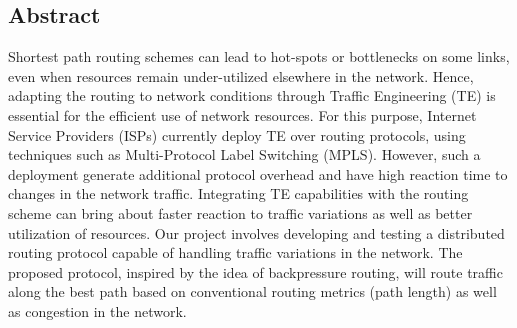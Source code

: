 \label{sec:abstract}
\begin{center}
\section*{Abstract}
\end{center}

Shortest path routing schemes can lead to hot-spots or bottlenecks on some links, even when resources remain under-utilized elsewhere in the network. Hence, adapting the routing to network conditions through Traffic Engineering (TE) is essential for the efficient use of network resources. For this purpose, Internet Service Providers (ISPs) currently deploy TE over routing protocols, using techniques such as Multi-Protocol Label Switching (MPLS). However, such a deployment generate additional protocol overhead and have high reaction time to changes in the network traffic. Integrating TE capabilities with the routing scheme can bring about faster reaction to traffic variations as well as better utilization of resources. Our project involves developing and testing a distributed routing protocol capable of handling traffic variations in the network. The proposed protocol, inspired by the idea of backpressure routing, will route traffic along the best path based on conventional routing metrics (path length) as well as  congestion in the network.
